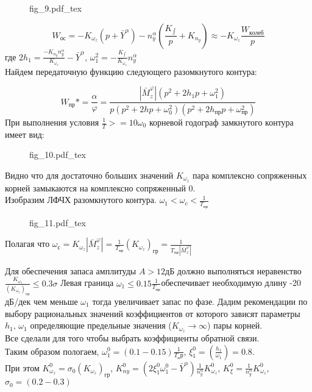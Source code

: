 \documentclass{article}
\begin{document}
\begin{figure}[H]
\begin{minipage}{\textwidth}
{fig_9.pdf_tex}
\end{minipage}
\end{figure}


\[
W_{ос} = -K_{\omega_z} (p+\bar{Y}^\alpha) - n_y^\alpha (\frac{K_{\int}}{p} + K_{n_y})
\approx -K_{\omega_z}\frac{W_{колеб}}{p}
\]
где $2h_1 = \frac{-K_{n_y} n_y^\alpha}{K_{\omega_z}} - \bar{Y}^\alpha$, $\omega_1^2 = -\frac{K_{\int}} {K_{\omega_z}} n_y^\alpha $\\
Найдем передаточную функцию следующего разомкнутого контура:

\[
W_{пр}* = {\frac{\alpha}{\varphi}} = \frac{|\bar{M}_z^\varphi| (p^2 + 2h_1 p + \omega_1^2)} {p(p^2 + 2 hp + \omega_0^2) (p^2 + 2h_{пр}p + \omega_{пр}^2)} 
\]
При выполнения условия $\frac{1}{T} >= 10 \omega_0$ корневой годограф замкнутого контура имеет вид:\\
\begin{figure}[H]
\centering
{fig_10.pdf_tex}
\end{figure}
Видно что для достаточно больших значений $K_{\omega_z}$ пара комплексно сопряженных корней замыкаются на комплексно сопряженный 0.\\
Изобразим ЛФЧХ разомкнутого контура.
$\omega_1 < \omega_c < \frac{1}{T_{пр}}$

\begin{figure}[H]
\centering
{fig_11.pdf_tex}
\end{figure}


Полагая что $\omega_с = K_{\omega_z} | \bar{M}_z^\varphi| = \frac{1}{T_{пр}}
(K_{\omega_z})_{гр} = \frac{1}{T_{пр}|\bar{M}_z^\varphi|}$

Для обеспечения запаса амплитуды $A > 12 дБ$ должно выполняться неравенство $\frac{K_{\omega_z}}{(K_{\omega_z})_{гр}} \leq 0.3 \sigma $
Левая граница $\omega_1 \leq 0.15 \frac{1}{T_{пр}}$обеспечивает необходимую длину -20 дБ/дек чем меньше $\omega_1$ тогда увеличивает запас по фазе.
Дадим рекомендации по выбору рациональных значений коэффициентов от которого зависят параметры $h_1, \, \omega_1$ определяющие предельные значения ($K_{\omega_z} \rightarrow\infty$) пары корней.\\
Все сделали для того чтобы выбрать коэффициенты обратной связи. \\ 
Таким образом пологаем, $\omega_1^0 = (0.1 - 0.15) \frac{1}{T_пр}$, $\xi_1^0 = (\frac{h_1}{\omega_1}) = 0.8$.\\
При этом $K_{\omega_z}^0 = \sigma_0 (K_{\omega_z})_{гр}$, $K_{ny}^0 = (2\xi_1^0 \omega_1^0 - \bar{Y}^\alpha) \frac{1}{n_y^\alpha} K_{\omega_z}^0$, $K_{\xi}^0 = \frac{1}{n_y^\alpha} K_{\omega_z}^0$, $\sigma_0 = (0.2 - 0.3)$
\newpage
\end{document}
